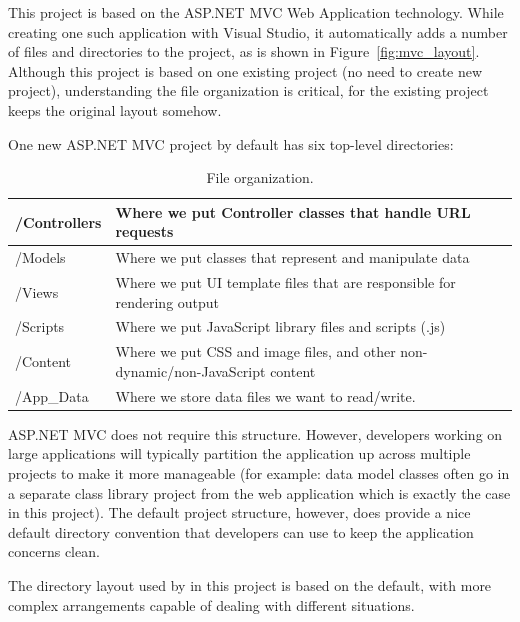 This project is based on the ASP.NET MVC Web Application technology. While creating one such application with Visual Studio, it automatically adds a 
number of files and directories to the project, as is shown in Figure~\ref{fig:mvc_layout}. Although this project is based on one existing project 
(no need to create new project), understanding the file organization is critical, for the existing project keeps the original layout somehow.

One new ASP.NET MVC project by default has six top-level directories: \cite{mvc_folder_layout}
\begin{table}[h]
	\begin{tabularx}{\textwidth}{| l | X |}
		\hline
		/Controllers & Where we put Controller classes that handle URL requests \\
		\hline
		/Models & Where we put classes that represent and manipulate data \\
		\hline
		/Views & Where we put UI template files that are responsible for rendering output \\
		\hline
		/Scripts & Where we put JavaScript library files and scripts (.js) \\
		\hline
		/Content & Where we put CSS and image files, and other non-dynamic/non-JavaScript content \\
		\hline
		/App\_Data & Where we store data files we want to read/write. \\
		\hline
	\end{tabularx}
	\caption{File organization.}
\end{table}

ASP.NET MVC does not require this structure. However, developers working on large applications will typically partition the application up across 
multiple projects to make it more manageable (for example: data model classes often go in a separate class library project from the web application 
which is exactly the case in this project).  The default project structure, however, does provide a nice default directory convention that developers 
can use to keep the application concerns clean.

The directory layout used by in this project is based on the default, with more complex arrangements capable of dealing with different situations.
